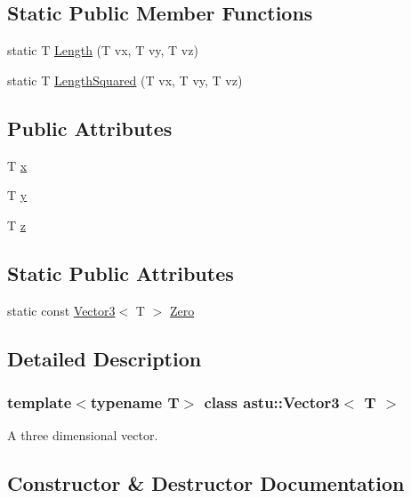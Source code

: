\subsection*{Static Public Member Functions}
\begin{DoxyCompactItemize}
\item 
static T \hyperlink{classastu_1_1Vector3_a44f82eb6e1c160a280bb870a88c5b412}{Length} (T vx, T vy, T vz)
\item 
static T \hyperlink{classastu_1_1Vector3_ac12866e8b85f6db591b789cd8c2e9563}{Length\+Squared} (T vx, T vy, T vz)
\end{DoxyCompactItemize}
\subsection*{Public Attributes}
\begin{DoxyCompactItemize}
\item 
T \hyperlink{classastu_1_1Vector3_a692793656a9174156dbe709b322f55a0}{x}
\item 
T \hyperlink{classastu_1_1Vector3_a72a148e22a4d8f032800b5bea1f7c963}{y}
\item 
T \hyperlink{classastu_1_1Vector3_a123e70de5cfb25f1c892e624efec50bc}{z}
\end{DoxyCompactItemize}
\subsection*{Static Public Attributes}
\begin{DoxyCompactItemize}
\item 
static const \hyperlink{classastu_1_1Vector3}{Vector3}$<$ T $>$ \hyperlink{classastu_1_1Vector3_ab5a825733eacd6996135dfb5d561b2e4}{Zero}
\end{DoxyCompactItemize}


\subsection{Detailed Description}
\subsubsection*{template$<$typename T$>$\newline
class astu\+::\+Vector3$<$ T $>$}

A three dimensional vector. 

\subsection{Constructor \& Destructor Documentation}
\mbox{\label{classastu_1_1Vector3_aa890c907a96b7a820d111650d367c128}} 
